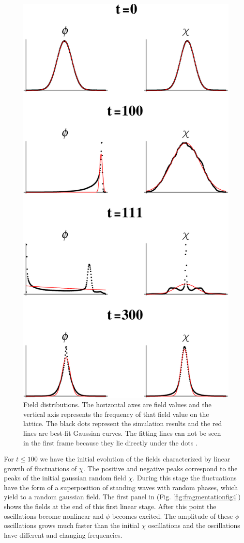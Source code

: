 \documentclass[11pt,a4paper,twoside]{book}
\begin{document}
\begin{figure}[h]
	\centering
	\includegraphics[width=0.6\linewidth, height=0.5\textheight]{Images/Chap5/Fragmentation_Fig6}
	\caption{Field distributions. The horizontal axes are field values and the vertical axis represents the frequency of that field value on the lattice. The black dots represent the simulation results and the red lines are best-fit Gaussian curves. The fitting lines can not be seen in the first frame  because they lie directly under the dots \cite{Chap5:Fragmentation}.}
	\label{fig:fragmentationfig6}
\end{figure}
For $ t \le 100 $ we have the initial evolution of the fields characterized by linear growth of fluctuations of $\chi$. The positive and negative peaks correspond to the peaks  of the initial gaussian random field $\chi$. During this stage the fluctuations have the form of a superposition of standing waves with random phases, which yield to a random gaussian field. The first panel in (Fig. \ref{fig:fragmentationfig4}) shows the fields at the end of this first linear stage. After this point the oscillations become nonlinear and $\phi$ becomes excited. The amplitude of these $\phi$ oscillations grows much faster than the initial $\chi$ oscillations and the oscillations have different and changing frequencies.\\
\end{document}
